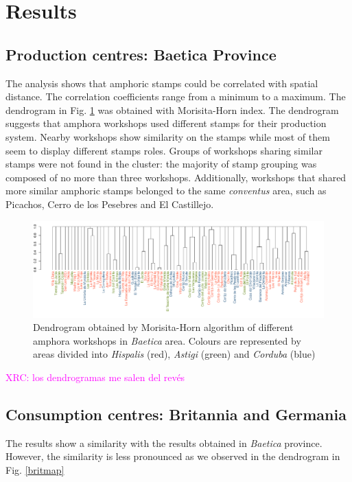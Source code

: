 \documentclass[review]{elsarticle}
\newcommand{\memo}[2]{\textcolor{#1}{#2}}
\newcommand{\xavi}[1]{\memo{magenta}{XRC: #1\\}}
\begin{document}
\section{Results}

\subsection{Production centres: Baetica Province}

The analysis shows that amphoric stamps could be correlated with spatial distance. The correlation coefficients range from a minimum to a maximum. The dendrogram in Fig. \ref{dendro} was obtained with Morisita-Horn index. The dendrogram suggests that amphora workshops used different stamps for their production system. Nearby workshops show similarity on the stamps while most of them seem to display different stamps roles. Groups of workshops sharing similar stamps were not found in the cluster: the majority of stamp grouping was composed of no more than three workshops. Additionally, workshops that shared more similar amphoric stamps belonged to the same \textit{conventus} area, such as Picachos, Cerro de los Pesebres and El Castillejo. 

\begin{figure}
	\centering
\includegraphics[width=\linewidth]{figs/dendro}
\caption{Dendrogram obtained by Morisita-Horn algorithm of different amphora workshops in \textit{Baetica} area. Colours are represented by areas divided into \textit{Hispalis} (red), \textit{Astigi} (green) and \textit{Corduba} (blue)}
\label{dendro}
\end{figure} 


\xavi{los dendrogramas me salen del revés}

\subsection{Consumption centres: Britannia and Germania}

The results show a similarity with the results obtained in \textit{Baetica} province. However, the similarity is less pronounced as we observed in the dendrogram in Fig. \ref{britmap}
\end{document}
